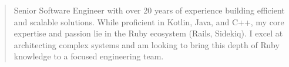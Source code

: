 \begin{minipage}{\linewidth}
\begin{quote}
Senior Software Engineer with over 20 years of experience building efficient and scalable solutions. While proficient in Kotlin, Java, and C++, my core expertise and passion lie in the Ruby ecosystem (Rails, Sidekiq). I excel at architecting complex systems and am looking to bring this depth of Ruby knowledge to a focused engineering team.
\end{quote}
\end{minipage}